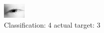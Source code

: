 \begin{figure}[h!]
\begin{center}
\includegraphics[width=0.60\columnwidth]{figures/ID105_class_4_target_3.png}
\end{center}
\caption{ Classification: 4 actual target: 3}
\label{fig:ID105_class_4_target_3}
\end{figure}
